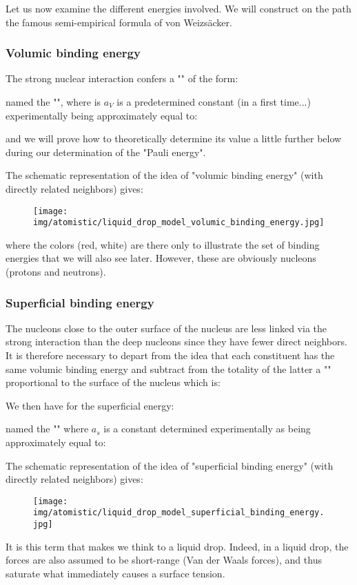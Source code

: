 	Let us now examine the different energies involved. We will construct on the path the famous semi-empirical formula of von Weizsäcker.
	
	\subsubsection{Volumic binding energy}
	The strong nuclear interaction confers a "" of the form:
	
	named the "", where is $a_V$ is a predetermined constant (in a first time...) experimentally being approximately equal to:
	
	and we will prove how to theoretically determine its value a little further below during our determination of the "Pauli energy".

	The schematic representation of the idea of "volumic binding energy" (with directly related neighbors) gives:
	\begin{figure}[H]
		\centering
		\texttt{[image: img/atomistic/liquid\_drop\_model\_volumic\_binding\_energy.jpg]}
	\end{figure}
	where the colors (red, white) are there only to illustrate the set of binding energies that we will also see later. However, these are obviously nucleons (protons and neutrons).
	
	\subsubsection{Superficial binding energy}
	The nucleons close to the outer surface of the nucleus are less linked via the strong interaction than the deep nucleons since they have fewer direct neighbors. It is therefore necessary to depart from the idea that each constituent has the same volumic binding energy and subtract from the totality of the latter a "" proportional to the surface of the nucleus which is:
	
	We then have for the superficial energy:
	
	named the "" where $a_s$ is a constant determined experimentally as being approximately equal to:
	
	The schematic representation of the idea of "superficial binding energy" (with directly related neighbors) gives:
	\begin{figure}[H]
		\centering
		\texttt{[image: img/atomistic/liquid\_drop\_model\_superficial\_binding\_energy.jpg]}
	\end{figure}
	It is this term that makes we think to a liquid drop. Indeed, in a liquid drop, the forces are also assumed to be short-range (Van der Waals forces), and thus saturate what immediately causes a surface tension.
	

